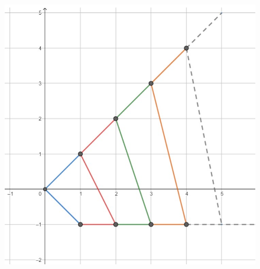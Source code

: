 \documentclass[11pt,largemargins]{homework}
\begin{document}
  \begin{figure}[htb]\centering
\includegraphics[scale=0.50]{martingalaex5.jpg}
  \end{figure}
  \newpage
\end{document}
